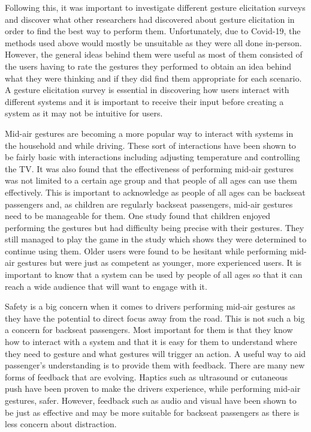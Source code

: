 \documentclass{l4proj}
\begin{document}
Following this, it was important to investigate different gesture elicitation surveys and discover what other researchers had discovered about gesture elicitation in order to find the best way to perform them. Unfortunately, due to Covid-19, the methods used above would mostly be unsuitable as they were all done in-person. However, the general ideas behind them were useful as most of them consisted of the users having to rate the gestures they performed to obtain an idea behind what they were thinking and if they did find them appropriate for each scenario. A gesture elicitation survey is essential in discovering how users interact with different systems and it is important to receive their input before creating a system as it may not be intuitive for users. 

Mid-air gestures are becoming a more popular way to interact with systems in the household and while driving. These sort of interactions have been shown to be fairly basic with interactions including adjusting temperature and controlling the TV. It was also found that the effectiveness of performing mid-air gestures was not limited to a certain age group and that people of all ages can use them effectively. This is important to acknowledge as people of all ages can be backseat passengers and, as children are regularly backseat passengers, mid-air gestures need to be manageable for them. One study found that children enjoyed performing the gestures but had difficulty being precise with their gestures. They still managed to play the game in the study which shows they were determined to continue using them. Older users were found to be hesitant while performing mid-air gestures but were just as competent as younger, more experienced users. It is important to know that a system can be used by people of all ages so that it can reach a wide audience that will want to engage with it. 

Safety is a big concern when it comes to drivers performing mid-air gestures as they have the potential to direct focus away from the road. This is not such a big a concern for backseat passengers. Most important for them is that they know how to interact with a system and that it is easy for them to understand where they need to gesture and what gestures will trigger an action. A useful way to aid passenger's understanding is to provide them with feedback. There are many new forms of feedback that are evolving. Haptics such as ultrasound or cutaneous push have been proven to make the drivers experience, while performing mid-air gestures, safer. However, feedback such as audio and visual have been shown to be just as effective and may be more suitable for backseat passengers as there is less concern about distraction.
\end{document}
